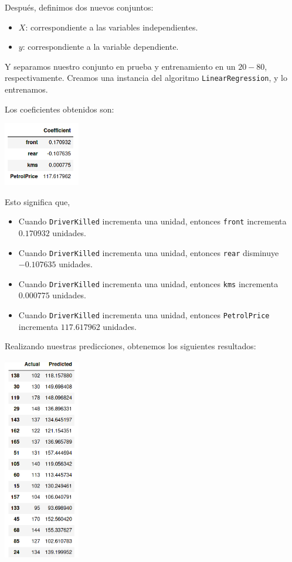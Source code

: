 \documentclass[letterpaper,11pt]{article}
\begin{document}
\begin{enumerate}
    Después, definimos dos nuevos conjuntos:
    \begin{itemize}
        \item $X$: correspondiente a las variables independientes.
        \item $y$: correspondiente a la variable dependiente.
    \end{itemize}

    Y separamos nuestro conjunto en prueba y entrenamiento en un $20-80$, 
    respectivamente. Creamos una instancia del algoritmo 
    \texttt{LinearRegression}, y lo entrenamos.

    Los coeficientes obtenidos son:
    \begin{center}
        \includegraphics[width=0.25\textwidth]{imagenes/seat9.png}
    \end{center}

    Esto significa que, 
    \begin{itemize}
        \item Cuando \texttt{DriverKilled} incrementa una unidad, entonces 
        \texttt{front} incrementa $0.170932$ unidades.

        \item Cuando \texttt{DriverKilled} incrementa una unidad, entonces 
        \texttt{rear} disminuye $-0.107635$ unidades.

        \item Cuando \texttt{DriverKilled} incrementa una unidad, entonces 
        \texttt{kms} incrementa $0.000775$ unidades.

        \item Cuando \texttt{DriverKilled} incrementa una unidad, entonces 
        \texttt{PetrolPrice} incrementa $117.617962$ unidades.
    \end{itemize}

    \newpage
    Realizando nuestras predicciones, obtenemos los siguientes resultados:
    \begin{center}
        \includegraphics[width=0.25\textwidth]{imagenes/seat10.png}
    \end{center}


\end{enumerate}
\end{document}
